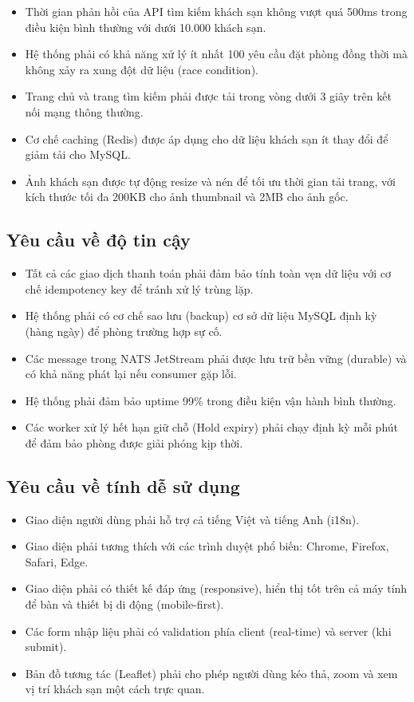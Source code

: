 \documentclass[13pt,a4paper,twoside]{report}
\begin{document}
\begin{itemize}
  \item Thời gian phản hồi của API tìm kiếm khách sạn không vượt quá 500ms trong điều kiện bình thường với dưới 10.000 khách sạn.
  \item Hệ thống phải có khả năng xử lý ít nhất 100 yêu cầu đặt phòng đồng thời mà không xảy ra xung đột dữ liệu (race condition).
  \item Trang chủ và trang tìm kiếm phải được tải trong vòng dưới 3 giây trên kết nối mạng thông thường.
  \item Cơ chế caching (Redis) được áp dụng cho dữ liệu khách sạn ít thay đổi để giảm tải cho MySQL.
  \item Ảnh khách sạn được tự động resize và nén để tối ưu thời gian tải trang, với kích thước tối đa 200KB cho ảnh thumbnail và 2MB cho ảnh gốc.
\end{itemize}

\subsection{Yêu cầu về độ tin cậy}

\begin{itemize}
  \item Tất cả các giao dịch thanh toán phải đảm bảo tính toàn vẹn dữ liệu với cơ chế idempotency key để tránh xử lý trùng lặp.
  \item Hệ thống phải có cơ chế sao lưu (backup) cơ sở dữ liệu MySQL định kỳ (hàng ngày) để phòng trường hợp sự cố.
  \item Các message trong NATS JetStream phải được lưu trữ bền vững (durable) và có khả năng phát lại nếu consumer gặp lỗi.
  \item Hệ thống phải đảm bảo uptime 99\% trong điều kiện vận hành bình thường.
  \item Các worker xử lý hết hạn giữ chỗ (Hold expiry) phải chạy định kỳ mỗi phút để đảm bảo phòng được giải phóng kịp thời.
\end{itemize}

\subsection{Yêu cầu về tính dễ sử dụng}

\begin{itemize}
  \item Giao diện người dùng phải hỗ trợ cả tiếng Việt và tiếng Anh (i18n).
  \item Giao diện phải tương thích với các trình duyệt phổ biến: Chrome, Firefox, Safari, Edge.
  \item Giao diện phải có thiết kế đáp ứng (responsive), hiển thị tốt trên cả máy tính để bàn và thiết bị di động (mobile-first).
  \item Các form nhập liệu phải có validation phía client (real-time) và server (khi submit).
  \item Bản đồ tương tác (Leaflet) phải cho phép người dùng kéo thả, zoom và xem vị trí khách sạn một cách trực quan.
\end{itemize}
\end{document}
